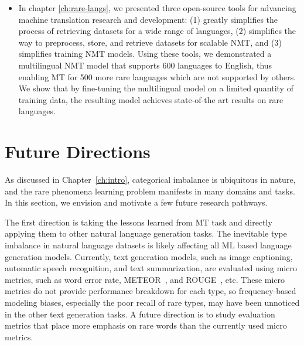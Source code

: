 \begin{itemize}
\item In chapter \ref{ch:rare-langs}, we presented three open-source tools for advancing machine translation research and development: (1) \mtdata{} greatly simplifies the process of retrieving datasets for a wide range of languages, (2) \nlcodec{} simplifies the way to preprocess, store, and retrieve datasets for scalable NMT, and (3) \rtg{} simplifies training NMT models.
 Using these tools, we demonstrated a multilingual NMT model that supports 600 languages to English, thus enabling MT for 500 more rare languages which are not supported by others. We show that by fine-tuning the multilingual model on a limited quantity of training data, the resulting model achieves state-of-the art results on rare languages. 
\end{itemize}


\section{Future Directions}

As discussed in Chapter~\ref{ch:intro}, categorical imbalance is ubiquitous in nature, and the rare phenomena learning problem manifests in many domains and tasks. In this section, we envision and motivate a few future research pathways.

The first direction is taking the lessons learned from MT task and directly applying them to other natural language generation tasks.  The inevitable type imbalance in natural language datasets is likely affecting all ML based language generation models.
Currently, text generation models, such as image captioning, automatic speech recognition, and text summarization, are evaluated using micro metrics, such as word error rate, METEOR~\cite{banerjee-lavie-2005-meteor}, and ROUGE~\cite{lin-2004-rouge}, etc. 
These micro metrics do not provide performance breakdown for each type, so frequency-based modeling biases, especially the poor recall of rare types, may have been unnoticed in the other text generation tasks.
A future direction is to study evaluation metrics that place more emphasis on rare words than the currently used micro metrics. 


